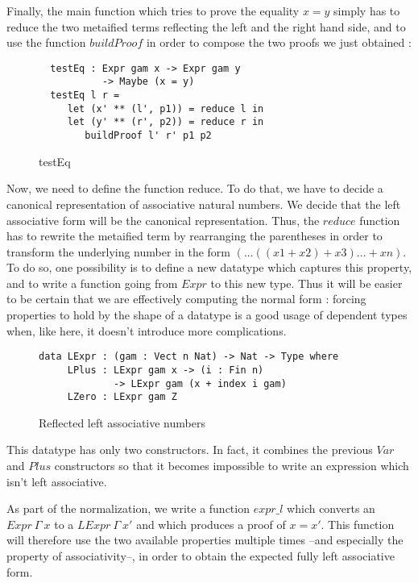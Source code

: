 Finally, the main function which tries to prove the equality $x=y$ simply has to reduce the two metaified terms reflecting the left and the right hand side, and to use the function $buildProof$ in order to compose the two proofs we just obtained :

\begin{figure}[H]
\figrule
\begin{center}
\begin{verbatim}
  testEq : Expr gam x -> Expr gam y 
           -> Maybe (x = y)
  testEq l r = 
     let (x' ** (l', p1)) = reduce l in 
     let (y' ** (r', p2)) = reduce r in
        buildProof l' r' p1 p2 
\end{verbatim}
\end{center}
\caption{testEq}
\figrule
\end{figure}

Now, we need to define the function reduce. To do that, we have to decide a canonical representation of associative natural numbers. We decide that the left associative form will be the canonical representation. Thus, the $reduce$ function has to rewrite the metaified term by rearranging the parentheses in order to transform the underlying number in the form $(...((x1 + x2) + x3) ... + xn)$. To do so, one possibility is to define a new datatype which captures this property, and to write a function going from $Expr$ to this new type. Thus it will be easier to be certain that we are effectively computing the normal form : forcing properties to hold by the shape of a datatype is a good usage of dependent types when, like here, it doesn't introduce more complications.

\begin{figure}[H]
\figrule
\begin{center}
\begin{verbatim}
data LExpr : (gam : Vect n Nat) -> Nat -> Type where
     LPlus : LExpr gam x -> (i : Fin n) 
             -> LExpr gam (x + index i gam)
     LZero : LExpr gam Z
\end{verbatim}
\end{center}
\caption{Reflected left associative numbers}
\figrule
\end{figure}

This datatype has only two constructors. In fact, it combines the previous $Var$ and $Plus$ constructors so that it becomes impossible to write an expression which isn't left associative.
 
As part of the normalization, we write a function $expr\_l$ which converts an $Expr\ \Gamma\ x$ to a $LExpr\ \Gamma\ x'$ and which produces a proof of $x=x'$. This function will therefore use the two available properties multiple times --and especially the property of associativity--, in order to obtain the expected fully left associative form. 

